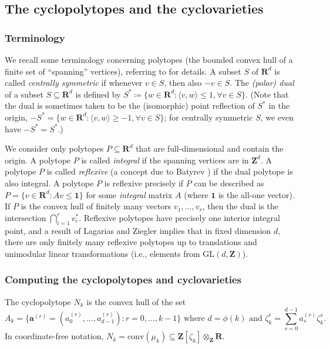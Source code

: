 \documentclass[12pt,reqno]{amsart}
\theoremstyle{definition}
\theoremstyle{plain}
\theoremstyle{definition}
\newcommand{\Z}{\mathbf{Z}}
\newcommand{\R}{\mathbf{R}}
\renewcommand{\geq}{\geqslant}
\renewcommand{\leq}{\leqslant}
\begin{document}
\subsection{The cyclopolytopes and the cyclovarieties} \label{cvarcpol}

\subsubsection*{Terminology} We recall some terminology concerning polytopes (the bounded convex hull of a finite set of ``spanning'' vertices), referring to \cite{polysurvey} for details. A subset $S$ of $\R^d$ is called \emph{centrally symmetric} if whenever $v \in S$, then also $-v \in S$. The \emph{(polar) dual} of a subset $S \subseteq \R^d$ is defined by $S^*\coloneqq  \{ w \in \R^d \colon \langle v,w \rangle \leq 1, \forall v \in S\}$. (Note that the dual is sometimes taken to be the (isomorphic) point reflection of $S^*$ in the origin, $-S^* =  \{ w \in \R^d \colon \langle v,w \rangle \geq -1, \forall v \in S\}$; for centrally symmetric $S$, we even have $-S^*=S^*$.)

We consider only polytopes $P \subseteq \R^d$ that are full-dimensional and contain the origin. A polytope $P$ is called \emph{integral} if the spanning vertices are in $\Z^d$. A polytope $P$ is called \emph{reflexive} (a concept due to Batyrev \cite{Batyrev}) if the dual polytope is also integral.  A polytope $P$ is reflexive precisely if $P$ can be described as $P = \{ v \in \R^d \colon A v \leq \mathbf{1} \}$ for some \emph{integral} matrix $A$ (where $\mathbf 1$ is the all-one vector). If $P$ is the convex hull of finitely many vectors $v_1,\dots,v_r$, then the dual is the intersection $\bigcap_{i=1}^r v_i^*$. Reflexive polytopes have precisely one interior integral point, and a result of Lagarias and Ziegler \cite{LagariasZiegler} implies that in fixed dimension $d$, there are only finitely many reflexive polytopes up to translations and unimodular linear transformations (i.e., elements from $\mathrm{GL}(d,\Z)$). 

\subsubsection*{Computing the cyclopolytopes and cyclovarieties} 

The cyclopolytope $N_k$ is the convex hull of the set $$A_k = \{ \mathbf{a}^{(r)}=(a^{(r)}_0,\dots,a^{(r)}_{d-1}) \colon r=0,\dots,k-1 \} \mbox { where } d=\phi(k) \mbox{ and } \zeta_k^r = \sum_{s=0}^{d-1} a_s^{(r)} \zeta_k^s. $$
In coordinate-free notation, $N_k = \mathrm{conv}(\mu_k) \subseteq \Z[\zeta_k] \otimes_{\Z} \R$. 
\end{document}
